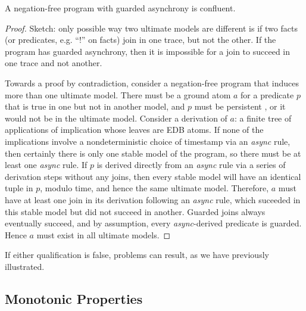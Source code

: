 \begin{lemma}
\label{lem:guarding}
A negation-free \lang program with guarded asynchrony is confluent.
\end{lemma}
\begin{proof}
Sketch: only possible way two ultimate models are different is if two facts (or predicates, e.g. ``!'' on facts) join in one trace, but not the other.  If the program has guarded asynchrony, then it is impossible for a join to succeed in one trace and not another.


Towards a proof by contradiction, consider a negation-free \lang program that 
induces more than one ultimate model.  There must be a ground atom $a$ for a predicate $p$
that is true in one but
not in another model, and $p$ must be persistent , or it would not be
in the ultimate model.  Consider a derivation of $a$: a finite tree of applications of
implication whose leaves are EDB atoms.  If none of the implications involve a nondeterministic
choice of timestamp via an {\em async} rule, then certainly there is only one stable model of the
program, so there must be at least one {\em async} rule.  If $p$ is derived directly from 
an {\em async} rule via a series of derivation steps without any joins, then every stable
model will have an identical tuple in $p$, modulo time, and hence the same ultimate model.
Therefore, $a$ must have at least one join in its derivation following an {\em async} rule,
which suceeded in this stable model but did not succeed in another.  Guarded joins always
eventually succeed, and by assumption, every {\em async}-derived predicate is guarded.
Hence $a$ must exist in all ultimate models.

\end{proof}


If either qualification is false, problems can result, as we have previously illustrated.


\subsection{Monotonic Properties}


